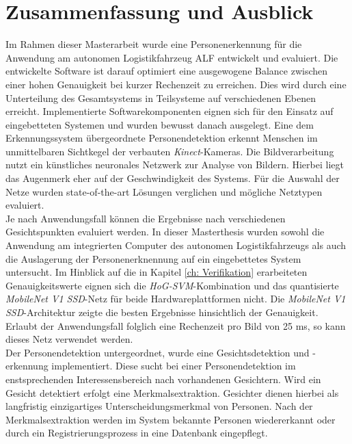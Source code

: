\chapter{Zusammenfassung und Ausblick}
\label{Fazit und Ausblick}
	
Im Rahmen dieser Masterarbeit wurde eine Personenerkennung für die Anwendung am autonomen Logistikfahrzeug ALF entwickelt und evaluiert. Die entwickelte Software ist darauf optimiert eine ausgewogene Balance zwischen einer hohen Genauigkeit bei kurzer Rechenzeit zu erreichen. Dies wird durch eine Unterteilung des Gesamtsystems in Teilsysteme auf verschiedenen Ebenen erreicht. Implementierte Softwarekomponenten eignen sich für den Einsatz auf eingebetteten Systemen und wurden bewusst danach ausgelegt. Eine dem Erkennungssystem übergeordnete Personendetektion erkennt Menschen im unmittelbaren Sichtkegel der verbauten \textit{Kinect}-Kameras. Die Bildverarbeitung nutzt ein künstliches neuronales Netzwerk zur Analyse von Bildern. Hierbei liegt das Augenmerk eher auf der Geschwindigkeit des Systems. Für die Auswahl der Netze wurden state-of-the-art Lösungen verglichen und mögliche Netztypen evaluiert.\\

Je nach Anwendungsfall können die Ergebnisse nach verschiedenen Gesichtspunkten evaluiert werden. In dieser Masterthesis wurden sowohl die Anwendung am integrierten Computer des autonomen Logistikfahrzeugs als auch die Auslagerung der Personenerknennung auf ein eingebettetes System untersucht. Im Hinblick auf die in Kapitel \ref{ch: Verifikation} erarbeiteten Genauigkeitswerte eignen sich die \textit{HoG-SVM}-Kombination und das quantisierte \textit{MobileNet V1 SSD}-Netz für beide Hardwareplattformen nicht. Die \textit{MobileNet V1 SSD}-Architektur zeigte die besten Ergebnisse hinsichtlich der Genauigkeit. Erlaubt der Anwendungsfall folglich eine Rechenzeit pro Bild von 25 ms, so kann dieses Netz verwendet werden.     \\

Der Personendetektion untergeordnet, wurde eine Gesichtsdetektion und -erkennung implementiert. Diese sucht bei einer Personendetektion im enstsprechenden Interessensbereich nach vorhandenen Gesichtern. Wird ein Gesicht detektiert erfolgt eine Merkmalsextraktion. Gesichter dienen hierbei als langfristig einzigartiges Unterscheidungsmerkmal von Personen. Nach der Merkmalsextraktion werden im System bekannte Personen wiedererkannt oder durch ein Registrierungsprozess in eine Datenbank eingepflegt.\\

